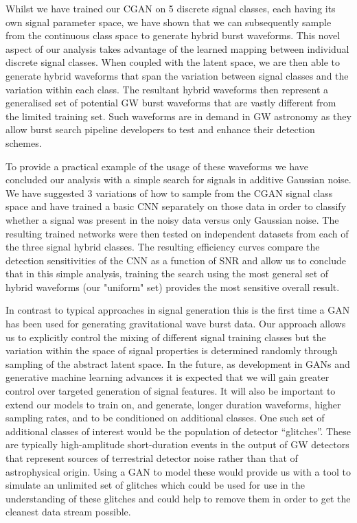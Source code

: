 \documentclass[12pt]{iopart}
\begin{document}
%
Whilst we have trained our \ac{CGAN} on 5 discrete signal classes, each having its own signal parameter space, we have shown that we can subsequently sample from the continuous class space to generate hybrid burst waveforms. This novel aspect of our analysis takes advantage of the learned mapping between individual discrete signal classes. When coupled with the latent space, we are then able to generate hybrid waveforms that span the variation between signal classes and the variation within each class. The resultant hybrid waveforms then represent a generalised set of potential \ac{GW} burst waveforms that are vastly different from the limited training set. Such waveforms are in demand in \ac{GW} astronomy as they allow burst search pipeline developers to test and enhance their detection schemes.    

%
To provide a practical example of the usage of these waveforms we have concluded our analysis with a simple search for signals in additive Gaussian noise. We have suggested 3 variations of how to sample from the \ac{CGAN} signal class space and have trained a basic \ac{CNN} separately on those data in order to classify whether a signal was present in the noisy data versus only Gaussian noise. The resulting trained networks were then tested on independent datasets from each of the three signal hybrid classes. The resulting efficiency curves compare the detection sensitivities of the \ac{CNN} as a function of \ac{SNR} and allow us to conclude that in this simple analysis, training the search using the most general set of hybrid waveforms (our "uniform" set) provides the most sensitive overall result. 

In contrast to typical approaches in signal generation this is the first time a \ac{GAN} has been used for generating gravitational wave burst data. Our approach allows us to explicitly control the mixing of different signal training classes but the variation within the space of signal properties is determined randomly through sampling of the abstract latent space. In the future, as development in \acp{GAN} and generative machine learning advances it is expected that we will gain greater control over targeted generation of signal features. It will also be important to extend our models to train on, and generate, longer duration waveforms, higher sampling rates, and to be conditioned on additional classes. One such set of additional classes of interest would be the population of detector ``glitches''. These are typically high-amplitude short-duration events in the output of \ac{GW} detectors that represent sources of terrestrial detector noise rather than that of astrophysical origin. Using a \ac{GAN} to model these would provide us with a tool to simulate an unlimited set of glitches which could be used for use in the understanding of these glitches and could help to remove them in order to get the cleanest data stream possible. 
\end{document}

